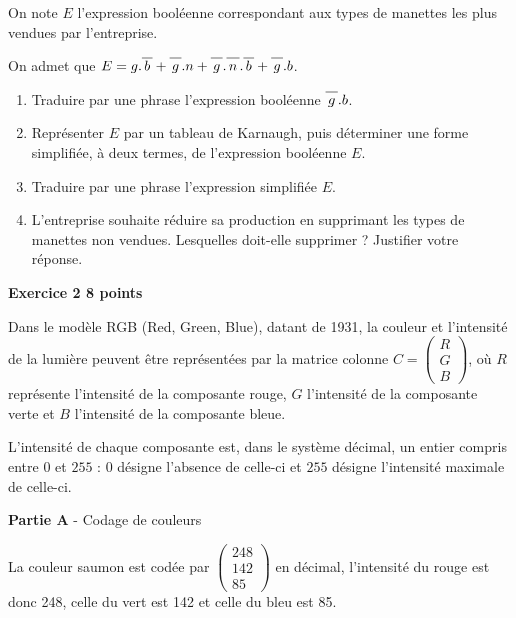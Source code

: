 \documentclass[10pt]{article}
\newcommand{\barre}[1]{\overline{\,\mathstrut#1\,}}
\begin{document}
On note $E$ l'expression booléenne correspondant aux types de manettes les plus vendues par l'entreprise.

On admet que $E= g.\barre{b} + \barre{g}.n + \barre{g}. \barre{n}. \barre{b} + \barre{g}. b$.

\medskip

\begin{enumerate}
\item Traduire par une phrase l'expression booléenne $\barre{g} . b$.
\item Représenter $E$ par un tableau de Karnaugh, puis déterminer une forme simplifiée, à
deux termes, de l'expression booléenne $E$.
\item Traduire par une phrase l'expression simplifiée $E$.
\item L'entreprise souhaite réduire sa production en supprimant les types de manettes non
vendues. Lesquelles doit-elle supprimer ? Justifier votre réponse.
\end{enumerate}

\vspace{0,5cm}

\textbf{Exercice 2 \hfill 8 points}

\medskip

Dans le modèle RGB (Red, Green, Blue), datant de 1931, la couleur et l'intensité de la lumière peuvent être représentées par la matrice colonne $C = \begin{pmatrix}R\\G\\B\end{pmatrix}$, où $R$ représente
l'intensité de la composante rouge, $G$ l'intensité de la composante verte et $B$ l'intensité de la composante bleue. 

L'intensité de chaque composante est, dans le système décimal, un entier compris entre $0$ et $255$ : $0$ désigne l'absence de celle-ci et $255$ désigne l'intensité maximale de celle-ci.

\bigskip

\textbf{Partie A} - Codage de couleurs

\medskip

La couleur \og saumon \fg{} est codée par $\begin{pmatrix}248\\142\\85\end{pmatrix}$ en décimal, l'intensité du rouge est donc 248, celle du vert est 142 et celle du bleu est 85. 
\end{document}
